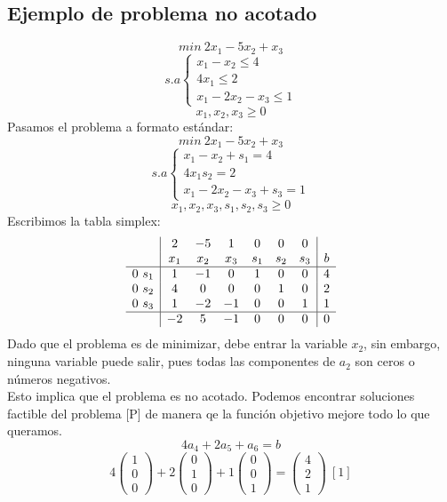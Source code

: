 \documentclass[11pt,fleqn]{book} %
\begin{document}
\subsection{Ejemplo de problema no acotado}
$$ min ~2x_1 - 5x_2 + x_3$$
$$
s.a \left\{ 
\begin{array}{c}
  x_1-x_2 \leq 4 \\
  4x_1 \leq 2 \\
  x_1 - 2x_2 - x_3 \leq 1
\end{array}
\right.$$
$$x_1, x_2, x_3 \geq 0$$ \newpage
Pasamos el problema a formato estándar:
$$ min ~2x_1 - 5x_2 + x_3$$
$$
s.a \left\{ 
\begin{array}{c}
  x_1-x_2+s_1 = 4 \\
  4x_1 s_2 = 2 \\
  x_1 - 2x_2 - x_3 + s_3 = 1
\end{array}
\right.$$
$$x_1, x_2, x_3, s_1, s_2, s_3 \geq 0$$
Escribimos la tabla simplex:
$$
\begin{array}{c|cccccc|c}
  & 2 & -5 & 1 & 0 & 0 & 0 & \\
  & x_1 & x_2 & x_3 & s_1 & s_2 & s_3 & b \\ \hline
  0 ~s_1 & 1 & -1 & 0 & 1 & 0 & 0 & 4 \\
  0 ~ s_2 & 4 & 0 & 0 & 0 & 1 & 0 & 2 \\
  0 ~s_3 & 1 & -2 & -1 & 0 & 0 & 1 & 1 \\ \hline
  & -2 & 5 & -1 & 0 & 0 & 0 & 0
\end{array}
$$
Dado que el problema es de minimizar, debe entrar la variable $x_2$, sin embargo, ninguna variable puede salir, pues todas las componentes de $a_2$ son ceros o números negativos. \\
Esto implica que el problema es no acotado. Podemos encontrar soluciones factible del problema [P] de manera qe la función objetivo mejore todo lo que queramos.
$$ 4 a_4+2a_5+a_6=b$$
$$4 \left(\begin{array}{c}
  1 \\ 0 \\ 0
\end{array}\right)+2\left(\begin{array}{c}
  0 \\ 1 \\ 0
\end{array}\right)+1\left(\begin{array}{c}
  0 \\ 0 \\ 1
\end{array}\right)=\left(\begin{array}{c}
  4 \\ 2 \\ 1
\end{array}\right) ~ [1]$$
\end{document}
